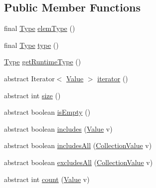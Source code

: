 \subsection*{Public Member Functions}
\begin{DoxyCompactItemize}
\item 
final \hyperlink{interfaceorg_1_1tzi_1_1use_1_1uml_1_1ocl_1_1type_1_1_type}{Type} \hyperlink{classorg_1_1tzi_1_1use_1_1uml_1_1ocl_1_1value_1_1_collection_value_a2e9a9c4cae1e0db7c9f855fe0ba61792}{elem\-Type} ()
\item 
final \hyperlink{interfaceorg_1_1tzi_1_1use_1_1uml_1_1ocl_1_1type_1_1_type}{Type} \hyperlink{classorg_1_1tzi_1_1use_1_1uml_1_1ocl_1_1value_1_1_collection_value_a1cd6d377d877ae38b640d21e1c945214}{type} ()
\item 
\hyperlink{interfaceorg_1_1tzi_1_1use_1_1uml_1_1ocl_1_1type_1_1_type}{Type} \hyperlink{classorg_1_1tzi_1_1use_1_1uml_1_1ocl_1_1value_1_1_collection_value_acaf3a0bafb8e648574599880271ad75c}{get\-Runtime\-Type} ()
\item 
abstract Iterator$<$ \hyperlink{classorg_1_1tzi_1_1use_1_1uml_1_1ocl_1_1value_1_1_value}{Value} $>$ \hyperlink{classorg_1_1tzi_1_1use_1_1uml_1_1ocl_1_1value_1_1_collection_value_aac05f9b03024383eb4e44fa9222500d4}{iterator} ()
\item 
abstract int \hyperlink{classorg_1_1tzi_1_1use_1_1uml_1_1ocl_1_1value_1_1_collection_value_adacdb52a513e722cd2c51a09cf08450f}{size} ()
\item 
abstract boolean \hyperlink{classorg_1_1tzi_1_1use_1_1uml_1_1ocl_1_1value_1_1_collection_value_a5407282c3ec32156038a6b03443b7059}{is\-Empty} ()
\item 
abstract boolean \hyperlink{classorg_1_1tzi_1_1use_1_1uml_1_1ocl_1_1value_1_1_collection_value_a1129823cc47d44d418a76b48f2704aff}{includes} (\hyperlink{classorg_1_1tzi_1_1use_1_1uml_1_1ocl_1_1value_1_1_value}{Value} v)
\item 
abstract boolean \hyperlink{classorg_1_1tzi_1_1use_1_1uml_1_1ocl_1_1value_1_1_collection_value_a986fb67d6be9a4cb1655c71ae4e78514}{includes\-All} (\hyperlink{classorg_1_1tzi_1_1use_1_1uml_1_1ocl_1_1value_1_1_collection_value}{Collection\-Value} v)
\item 
abstract boolean \hyperlink{classorg_1_1tzi_1_1use_1_1uml_1_1ocl_1_1value_1_1_collection_value_ab254685474483554eadf9659043cd060}{excludes\-All} (\hyperlink{classorg_1_1tzi_1_1use_1_1uml_1_1ocl_1_1value_1_1_collection_value}{Collection\-Value} v)
\item 
abstract int \hyperlink{classorg_1_1tzi_1_1use_1_1uml_1_1ocl_1_1value_1_1_collection_value_a17914c59db6c852cac03dec40149d28d}{count} (\hyperlink{classorg_1_1tzi_1_1use_1_1uml_1_1ocl_1_1value_1_1_value}{Value} v)

\end{DoxyCompactItemize}

